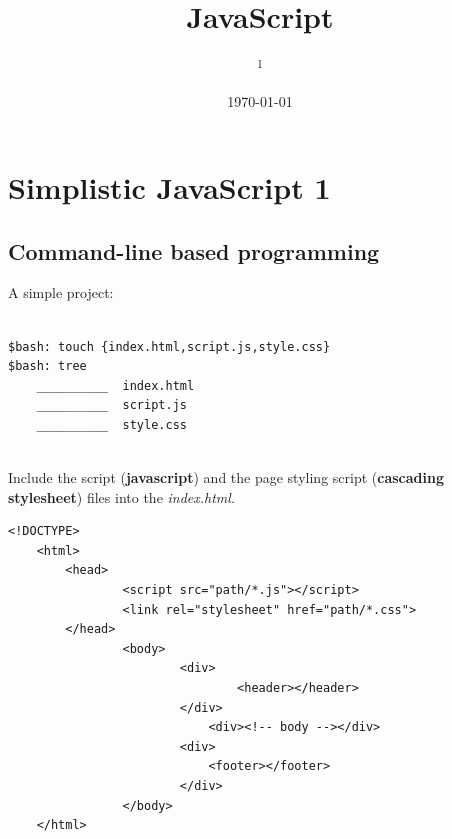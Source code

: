 \documentclass[10pt, a4paper, twocolumn]{article}
\title{JavaScript}
\author{
	\authorstyle{Boitumelo Phetla\textsuperscript{1}} %
	\newline\newline %
	\textsuperscript{1}\institution{PluralSight Google ScholarShip}
}
\date{\today} %
\begin{document}
\maketitle %
\thispagestyle{firstpage} %




\section{Simplistic JavaScript 1}

\subsection{Command-line based programming}

A simple project:

\begin{lstlisting}

$bash: touch {index.html,script.js,style.css}
$bash: tree
	__________	index.html
	__________	script.js
	__________	style.css


\end{lstlisting}

Include the script (\textbf{javascript}) and the page styling script (\textbf{cascading stylesheet}) files into the \textit{index.html}.

\begin{lstlisting}
<!DOCTYPE>
	<html>
		<head>
				<script src="path/*.js"></script>
				<link rel="stylesheet" href="path/*.css">
		</head>
				<body>
						<div>
								<header></header>
						</div>
							<div><!-- body --></div>
						<div>
							<footer></footer>
						</div>
				</body>
	</html>

\end{lstlisting}
\end{document}
